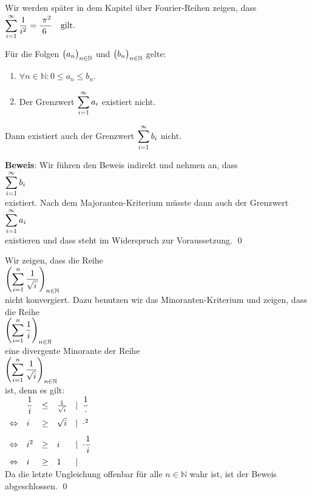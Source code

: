 \remark
Wir werden sp\"ater in dem Kapitel \"uber Fourier-Reihen zeigen, dass 
\\[0.2cm]
\hspace*{1.3cm}
$\displaystyle\sum\limits_{i=1}^{\infty} \frac{1}{i^2} = \frac{\;\pi^2}{6\;} \quad\mbox{gilt.} $ \eox

\begin{Satz}
F\"ur die Folgen $\bigl(a_n\bigr)_{n\in\mathbb{N}}$  und  $\bigl(b_n\bigr)_{n\in\mathbb{N}}$  gelte:
\begin{enumerate}
\item $\forall n \in \mathbb{N}: 0 \leq a_n \leq b_n$.
\item Der Grenzwert $\displaystyle\sum\limits_{i=1}^\infty a_i$ existiert nicht.
\end{enumerate}
Dann existiert auch der Grenzwert $\displaystyle\sum\limits_{i=1}^\infty b_i$ nicht.
\end{Satz}

\noindent
\textbf{Beweis}:  Wir f\"uhren den Beweis indirekt und nehmen an, dass 
\\[0.2cm]
\hspace*{1.3cm}
$\displaystyle\sum\limits_{i=1}^\infty b_i$
\\[0.2cm]
existiert.  Nach dem Majoranten-Kriterium m\"usste dann auch der Grenzwert
\\[0.2cm]
\hspace*{1.3cm}
$\displaystyle\sum\limits_{i=1}^\infty a_i$
\\[0.2cm]
existieren und dass steht im Widerspruch zur Voraussetzung. 
\qed

\example
Wir zeigen, dass die Reihe 
\\[0.2cm]
\hspace*{1.3cm}
 $\displaystyle\left(\sum\limits_{i=1}^n \frac{1}{\sqrt{i\,}}\right)_{n\in\mathbb{N}}$ \\[0.2cm]
nicht konvergiert.  Dazu
benutzen wir das Minoranten-Kriterium und zeigen, dass die
Reihe
\\[0.2cm]
\hspace*{1.3cm}
 $\displaystyle\left(\sum\limits_{i=1}^n \frac{1}{i}\right)_{n\in\mathbb{N}}$ 
\\[0.2cm]
eine divergente Minorante der Reihe
\\[0.2cm]
\hspace*{1.3cm}
  $\displaystyle\left(\sum\limits_{i=1}^n \frac{1}{\sqrt{i}}\right)_{n\in\mathbb{N}}$ 
\\[0.2cm]
ist, denn es gilt: 
\\[0.2cm]
\hspace*{1.3cm}
$
\begin{array}{llcll}
                 & \displaystyle\frac{1}{i}   & \leq & \frac{1}{\sqrt{i}}  & \displaystyle\mid \; \frac{1}{\cdot}\\[0.3cm]
\Leftrightarrow  & i              & \geq & \sqrt{i}             & \mid \;\cdot^2  \\[0.3cm]
\Leftrightarrow  & i^2            & \geq & i                    & \displaystyle\mid \; \cdot \frac{1}{i}  \\[0.3cm]
\Leftrightarrow  & i              & \geq & 1                    & \mid \; 
\end{array}
$
\\[0.2cm]
Da die letzte Ungleichung offenbar f\"ur alle $n\in \mathbb{N}$ wahr ist, ist der Beweis abgeschlossen.
\qed

